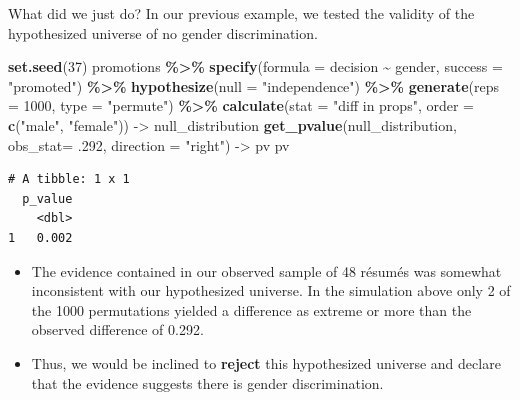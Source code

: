 \documentclass[
  ignorenonframetext,
]{beamer}
\newenvironment{Shaded}{\begin{snugshade}}{\end{snugshade}}
\newcommand{\AttributeTok}[1]{\textcolor[rgb]{0.13,0.29,0.53}{#1}}
\newcommand{\DecValTok}[1]{\textcolor[rgb]{0.00,0.00,0.81}{#1}}
\newcommand{\FunctionTok}[1]{\textcolor[rgb]{0.13,0.29,0.53}{\textbf{#1}}}
\newcommand{\NormalTok}[1]{#1}
\newcommand{\OtherTok}[1]{\textcolor[rgb]{0.56,0.35,0.01}{#1}}
\newcommand{\SpecialCharTok}[1]{\textcolor[rgb]{0.81,0.36,0.00}{\textbf{#1}}}
\newcommand{\StringTok}[1]{\textcolor[rgb]{0.31,0.60,0.02}{#1}}
\begin{document}
\begin{frame}[fragile]{What did we just do?}
\protect\hypertarget{what-did-we-just-do-1}{}
In our previous example, we tested the validity of the hypothesized
universe of no gender discrimination.

\tiny

\begin{Shaded}
\begin{Highlighting}[]
\FunctionTok{set.seed}\NormalTok{(}\DecValTok{37}\NormalTok{)}
\NormalTok{promotions }\SpecialCharTok{\%\textgreater{}\%} 
  \FunctionTok{specify}\NormalTok{(}\AttributeTok{formula =}\NormalTok{ decision }\SpecialCharTok{\textasciitilde{}}\NormalTok{ gender, }\AttributeTok{success =} \StringTok{"promoted"}\NormalTok{) }\SpecialCharTok{\%\textgreater{}\%} 
  \FunctionTok{hypothesize}\NormalTok{(}\AttributeTok{null =} \StringTok{"independence"}\NormalTok{) }\SpecialCharTok{\%\textgreater{}\%} 
  \FunctionTok{generate}\NormalTok{(}\AttributeTok{reps =} \DecValTok{1000}\NormalTok{, }\AttributeTok{type =} \StringTok{"permute"}\NormalTok{) }\SpecialCharTok{\%\textgreater{}\%} 
  \FunctionTok{calculate}\NormalTok{(}\AttributeTok{stat =} \StringTok{"diff in props"}\NormalTok{, }\AttributeTok{order =} \FunctionTok{c}\NormalTok{(}\StringTok{"male"}\NormalTok{, }\StringTok{"female"}\NormalTok{)) }\OtherTok{{-}\textgreater{}}\NormalTok{ null\_distribution}
\FunctionTok{get\_pvalue}\NormalTok{(null\_distribution, }\AttributeTok{obs\_stat=}\NormalTok{ .}\DecValTok{292}\NormalTok{, }\AttributeTok{direction =} \StringTok{"right"}\NormalTok{) }\OtherTok{{-}\textgreater{}}\NormalTok{ pv}
\NormalTok{pv}
\end{Highlighting}
\end{Shaded}

\begin{verbatim}
# A tibble: 1 x 1
  p_value
    <dbl>
1   0.002
\end{verbatim}

\normalsize

\begin{itemize}
\item
  The evidence contained in our observed sample of 48 résumés was
  somewhat inconsistent with our hypothesized universe. In the
  simulation above only 2 of the 1000 permutations yielded a difference
  as extreme or more than the observed difference of 0.292.
\item
  Thus, we would be inclined to \textbf{reject} this hypothesized
  universe and declare that the evidence suggests there is gender
  discrimination.
\end{itemize}
\end{frame}
\end{document}
